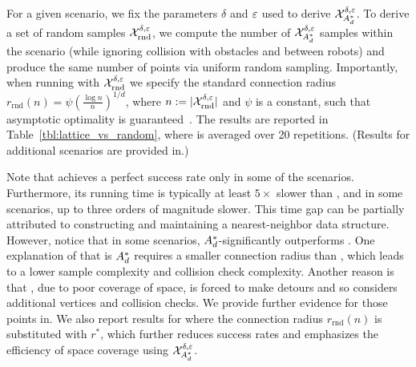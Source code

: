 For a given scenario, we fix the parameters $\delta$ and $\varepsilon$ used to derive $\mathcal{X}_{A_d^*}^{\delta,\varepsilon}$. To derive a set of random samples $\mathcal{X}_{\text{rnd}}^{\delta,\varepsilon}$, we compute the number of $\mathcal{X}_{A_d^*}^{\delta,\varepsilon}$ samples within the scenario (while ignoring collision with obstacles and between robots) and produce the same number of points via uniform random sampling. Importantly, when running \glo with $\mathcal{X}_{\text{rnd}}^{\delta,\varepsilon}$ we specify the standard connection radius  $r_\text{rnd}(n)=\psi \left(\frac{\log n}{n}\right)^{1/d}$, where $n:=|\mathcal{X}_{\text{rnd}}^{\delta,\varepsilon}|$ and $\psi$ is a constant, such that asymptotic optimality is guaranteed~\cite{karaman2011sampling}. The results are reported in  Table~\ref{tbl:lattice_vs_random}, where \rnd is averaged over 20 repetitions. (Results for additional scenarios are provided in.)


Note that \rnd achieves a perfect success rate only in some of the scenarios. Furthermore, its running time is typically at least $5\times$ slower than \loc, and in some scenarios, up to three orders of magnitude slower. This time gap can be partially attributed to \rnd constructing and maintaining a nearest-neighbor data structure. However, notice that in some scenarios, $A_d^*$-\glo significantly outperforms \rnd. One explanation of that is $A_d^*$ requires a smaller connection radius than \rnd, which leads to a lower sample complexity and collision check complexity. Another reason is that \rnd, due to poor coverage of space, is forced to make detours and so considers additional vertices and collision checks. We provide further evidence for those points in. We also report results for \rnd where the connection radius $r_\text{rnd}(n)$ is substituted with $r^*$, which further reduces success rates and emphasizes the efficiency of space coverage using $\mathcal{X}_{A_d^*}^{\delta,\varepsilon}$.


